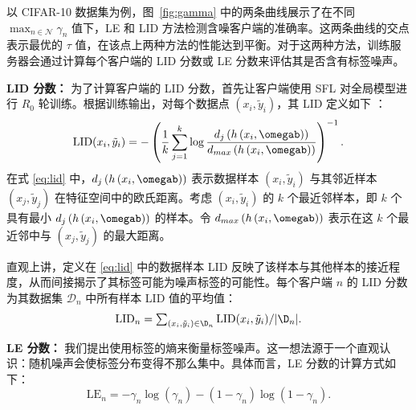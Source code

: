 以 CIFAR-10 数据集为例，图~\ref{fig:gamma} 中的两条曲线展示了在不同 $\max_{n \in \mathcal{N}} \gamma_n$ 值下，LE 和 LID 方法检测含噪客户端的准确率。这两条曲线的交点表示最优的 $\tau$ 值，在该点上两种方法的性能达到平衡。对于这两种方法，训练服务器会通过计算每个客户端的 LID 分数或 LE 分数来评估其是否含有标签噪声。

\textbf{LID 分数：} 为了计算客户端的 LID 分数，首先让客户端使用 SFL 对全局模型进行 $R_0$ 轮训练。根据训练输出，对每个数据点 $(x_i,\tilde{y}_i)$，其 LID 定义如下 \cite{b9,amsaleg2015estimating,houle2013dimensionality}：
\begin{align}\label{eq:lid}
\text{LID}(x_i,\tilde{y}_i)=-\left(\frac{1}{k}\sum_{j=1}^k\log\frac{d_j\left(h\left(x_i,\omegab\right)\right)}{d_{max}\left(h\left(x_i,\omegab\right)\right)}\right)^{-1}.
\end{align}
在式 \eqref{eq:lid} 中，$d_j\left(h\left(x_i,\omegab\right)\right)$ 表示数据样本 $(x_i,\tilde{y}_i)$ 与其邻近样本 $(x_j,\tilde{y}_j)$ 在特征空间中的欧氏距离。考虑 $(x_i,\tilde{y}_i)$ 的 $k$ 个最近邻样本，即 $k$ 个具有最小 $d_j\left(h\left(x_i,\omegab\right)\right)$ 的样本。令 $d_{max}\left(h\left(x_i,\omegab\right)\right)$ 表示在这 $k$ 个最近邻中与 $(x_j,\tilde{y}_j)$ 的最大距离。

直观上讲，定义在 \eqref{eq:lid} 中的数据样本 LID 反映了该样本与其他样本的接近程度，从而间接揭示了其标签可能为噪声标签的可能性。每个客户端 $n$ 的 LID 分数为其数据集 $\mathcal{D}_n$ 中所有样本 LID 值的平均值：
\begin{equation}\label{definition of lid}
\textstyle \text{LID}_n = \sum_{(x_i,\tilde{y}_i)\in\D_{n}} \text{LID}(x_i,\tilde{y}_i)/|\D_n|.
\end{equation}

\textbf{LE 分数：} 我们提出使用标签的熵来衡量标签噪声。这一想法源于一个直观认识：随机噪声会使标签分布变得不那么集中。具体而言，LE 分数的计算方式如下：
\begin{equation}\label{eq:LE}
\text{LE}_n=-\gamma_n\log(\gamma_n)-(1-\gamma_n)\log(1-\gamma_n).
\end{equation}

